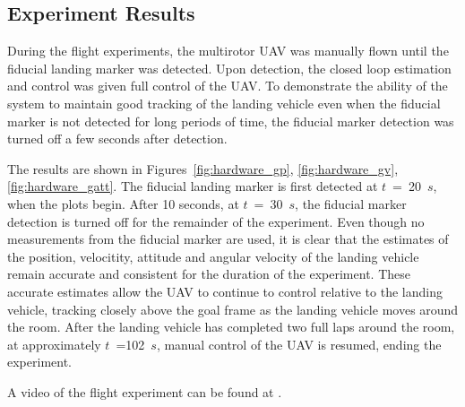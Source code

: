 
\subsection{Experiment Results}
During the flight experiments, the multirotor UAV was manually flown until the
fiducial landing marker was detected. Upon detection, the closed loop estimation
and control was given full control of the UAV. To demonstrate the ability of the
system to maintain good tracking of the landing vehicle even when the fiducial
marker is not detected for long periods of time, the fiducial marker detection
was turned off a few seconds after detection.

The results are shown in Figures~\ref{fig:hardware_gp}, \ref{fig:hardware_gv},
\ref{fig:hardware_gatt}. The fiducial landing marker is first detected at
$t$~=~20~$s$, when the plots begin. After 10 seconds, at $t$~=~30~$s$, the
fiducial marker detection is turned off for the remainder of the experiment.
Even though no measurements from the fiducial marker are used, it is clear that
the estimates of the position, velocitity, attitude and angular velocity of the
landing vehicle remain accurate and consistent for the duration of the
experiment. These accurate estimates allow
the UAV to continue to control relative to the landing vehicle, tracking closely
above the goal frame as the landing vehicle moves around the room. After the
landing vehicle has completed two full laps around the room,
at approximately $t$~=102~$s$, manual control of the UAV is resumed, ending the experiment.

A video of the flight experiment can be found at .

